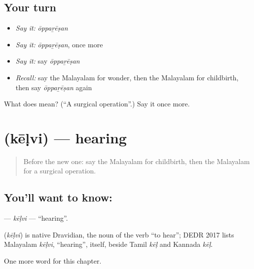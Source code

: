 \subsection*{Your turn}
\begin{itemize}
\raggedright
  \item \emph{Say it:} \emph{ōppaṟēṣan}
  \item \emph{Say it:} \emph{ōppaṟēṣan}, once more
  \item \emph{Say it:} say \emph{ōppaṟēṣan}
  \item \emph{Recall:} say the Malayalam for wonder, then the Malayalam for childbirth, then say \emph{ōppaṟēṣan} again
\end{itemize}

\begin{tcolorbox}[breakable,colback=teal!4,colframe=teal!35!black,title={Before you move on}]
What does  mean? (\textquotedblleft{}A surgical operation\textquotedblright{}.) Say it once more.
\end{tcolorbox}
\section[\texorpdfstring{\ml{കേൾവി} (kēḷvi)}{കേൾവി (kēḷvi)}]{ (kēḷvi) — hearing}

\label{lesson:ML-C194-kelvi}



\begin{quote}
Before the new one: say the Malayalam for childbirth, then the Malayalam for a surgical operation.
\end{quote}

\subsection*{You'll want to know: }
\textbf{} — \emph{kēḷvi} — \textquotedblleft{}hearing\textquotedblright{}.

\begin{cousinweb}
\textbf{} (\emph{kēḷvi}) is native Dravidian, the noun of the verb \textquotedblleft{}to hear\textquotedblright{}; DEDR 2017 lists Malayalam \emph{kēḷvi}, \textquotedblleft{}hearing\textquotedblright{}, itself, beside Tamil \emph{kēḷ} and Kannada \emph{kēḷ}.
\end{cousinweb}

\begin{grammarlens}[title={What you've built}]
One more word for this chapter.
\end{grammarlens}

